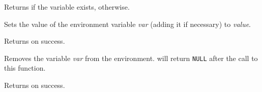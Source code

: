 Returns \true if the variable exists, \false otherwise.


\label{wxsetenv}


Sets the value of the environment variable {\it var} (adding it if necessary)
to {\it value}.

Returns \true on success.


\label{wxunsetenv}


Removes the variable {\it var} from the environment.
 will return {\tt NULL} after the call to this
function.

Returns \true on success.
